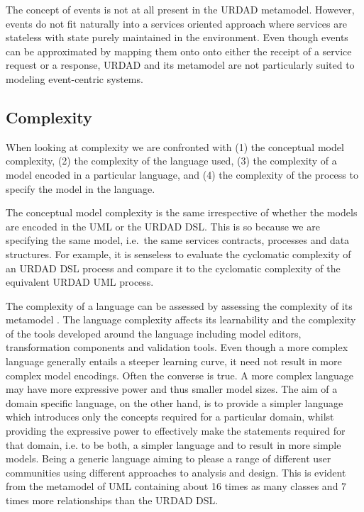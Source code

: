 The concept of events is not at all present in the URDAD metamodel. However, events do not fit naturally into a services oriented approach where services are stateless with state purely maintained in the environment. Even though events can be approximated by mapping them onto onto either the receipt of a service request or a response, URDAD and its metamodel are not particularly suited to modeling event-centric systems.


\subsection{Complexity}

When looking at complexity we are confronted with (1) the conceptual model complexity, (2) the complexity of the language used, (3) the complexity of a model encoded in a particular language, and (4) the complexity of the process to specify the model in the language. 

The conceptual model complexity is the same irrespective of whether the models are encoded in the UML or the URDAD DSL. This is so because we are specifying the same model, i.e.\ the same services contracts, processes and data structures. For example, it is senseless to evaluate the cyclomatic complexity \cite{mccabe_complexity_1976} of an URDAD DSL process and compare it to the cyclomatic complexity of the equivalent URDAD UML process.

The complexity of a language can be assessed by assessing the complexity of its metamodel \cite{mohagheghi_evaluating_2007}. The language complexity affects its learnability and the complexity of the tools developed around the language including model editors, transformation components and validation tools. Even though a more complex language generally entails a steeper learning curve, it need not result in more complex model encodings. Often the converse is true. A more complex language may have more expressive power and thus smaller model sizes. The aim of a domain specific language, on the other hand, is to provide a simpler language which introduces only the concepts required for a particular domain, whilst providing the expressive power to effectively make the statements required for that domain, i.e. to be both, a simpler language and to result in more simple models. Being a generic language aiming to please a range of different user communities using different approaches to analysis and design. This is evident from the metamodel of UML containing about 16 times as many classes and 7 times more relationships than the URDAD DSL.

